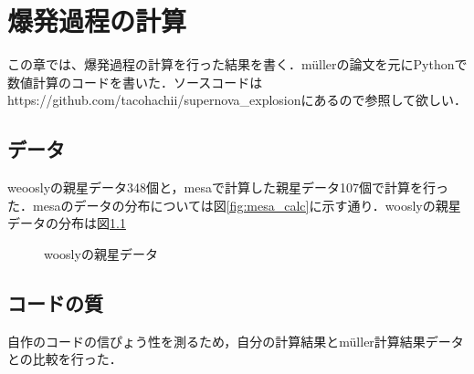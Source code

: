 \chapter{爆発過程の計算}
\label{chap:muller_calc}

この章では、爆発過程の計算を行った結果を書く．m\"{u}llerの論文\cite{muller}を元にPythonで数値計算のコードを書いた．ソースコードはhttps://github.com/tacohachii/supernova\_explosionにあるので参照して欲しい．

\section{データ}

weooslyの親星データ348個\cite{woosly}と，mesaで計算した親星データ107個で計算を行った．mesaのデータの分布については図\ref{fig:mesa_calc}に示す通り．wooslyの親星データの分布は図\ref{fig:woosly_data}

\begin{figure}[htbp]
  \begin{center}
  \end{center}
  \caption{wooslyの親星データ}
  \label{fig:woosly_data}
\end{figure}


\section{コードの質}

自作のコードの信ぴょう性を測るため，自分の計算結果とm\"{u}ller計算結果データとの比較を行った．

